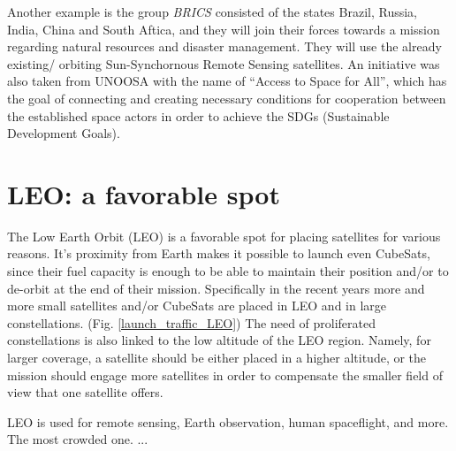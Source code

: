 Another example is the group \textit{BRICS} consisted of the states Brazil, Russia, India, China and South Aftica, and they will join their forces towards a mission regarding natural resources and disaster management. They will use the already existing/ orbiting Sun-Synchornous Remote Sensing satellites. An initiative was also taken from UNOOSA with the name of \hspace{1mm} “Access to Space for All”, which has the goal of connecting and creating necessary conditions for cooperation between the established space actors in order to achieve the SDGs (Sustainable Development Goals).


\bigskip
\section{LEO: a favorable spot}
\bigskip

The Low Earth Orbit (LEO) is a favorable spot for placing satellites for various reasons. It's proximity from Earth makes it possible to launch even CubeSats, since their fuel capacity is enough to be able to maintain their position and/or to de-orbit at the end of their mission. Specifically in the recent years more and more small satellites and/or CubeSats are placed in LEO and in large constellations. (Fig. \ref{launch_traffic_LEO}) The need of proliferated constellations is also linked to the low altitude of the LEO region. Namely, for larger coverage, a satellite should be either placed in a higher altitude, or the mission should engage more satellites in order to compensate the smaller field of view that one satellite offers.

LEO is used for remote sensing, Earth observation, human spaceflight, and more. The most crowded one. 
...




